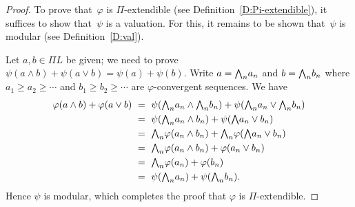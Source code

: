 \documentclass[main.tex]{subfiles}
\begin{document}
\begin{proof}
To prove that~$\varphi$ is $\Pi$-extendible
(see Definition~\ref{D:Pi-extendible}),
it suffices to show that~$\psi$ is a valuation.
For this,
it remains to be shown that~$\psi$ is modular
(see Definition~\ref{D:val}).

Let $a,b\in \Pi L$ be given; 
we need to prove $\psi(a\wedge b) + \psi(a\vee b)= \psi(a)+\psi(b)$.
Write  $a = \textstyle{\bigwedge}_n a_n$ and $b = \textstyle{\bigwedge}_n b_n$
where 
 $a_1 \geq a_2 \geq \dotsb$ and $b_1 \geq b_2 \geq \dotsb$
are $\varphi$-convergent sequences.
We have
\begin{alignat*}{3}
\varphi(a\wedge b) + \varphi(a \vee b) 
\ &=\ \psi(\textstyle{\bigwedge}_n a_n \wedge \textstyle{\bigwedge}_n b_n) + \psi(\textstyle{\bigwedge}_n a_n \vee \textstyle{\bigwedge}_n b_n) \\
\ &=\ \psi(\textstyle{\bigwedge}_n a_n \wedge b_n) + \psi(\textstyle{\bigwedge} a_n \vee b_n) \\
  &=\ \textstyle{\bigwedge}_n \varphi(a_n \wedge b_n) + \textstyle{\bigwedge}_n \varphi(\textstyle{\bigwedge} a_n \vee b_n) \\
  &=\ \textstyle{\bigwedge}_n \varphi(a_n \wedge b_n) + \varphi(a_n \vee b_n) \\
  &=\ \textstyle{\bigwedge}_n \varphi(a_n) + \varphi(b_n) \\
  &=\ \psi(\textstyle{\bigwedge}_n a_n) + \psi(\textstyle{\bigwedge}_n b_n).
\end{alignat*}
Hence $\psi$ is modular, which completes the proof
that $\varphi$ is $\Pi$-extendible.
\end{proof}
%
%
\end{document}
